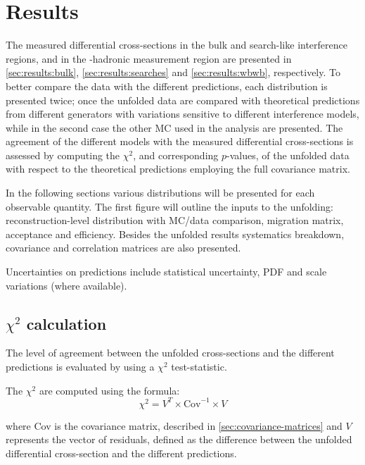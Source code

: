 \section{Results}%
\label{ch:results}

The measured differential cross-sections in the bulk and search-like
interference regions, and in the \Wboson-hadronic measurement region are presented in
\cref{sec:results:bulk}, \cref{sec:results:searches} and \cref{sec:results:wbwb},
respectively.
To better compare the data with the different predictions, each distribution
is presented twice; once the unfolded data are compared with theoretical
predictions from different generators with variations sensitive to different
interference models, while in the second case the other MC used in the analysis
are presented. The agreement of the different models with the measured
differential cross-sections is assessed by computing the \(\chi^2\),
and corresponding \(p\)-values, of the unfolded data with respect
to the theoretical predictions employing the full covariance matrix.

In the following sections various distributions will be presented for each
observable quantity. The first figure will outline the inputs to the unfolding:
reconstruction-level distribution with MC/data comparison, migration matrix,
acceptance and efficiency. Besides the unfolded results systematics breakdown,
covariance and correlation matrices are also presented.

Uncertainties on predictions include statistical uncertainty, PDF and scale variations (where available).


\subsection{\texorpdfstring{\(\chi^2\)}{Chi squared} calculation}

The level of agreement between the unfolded cross-sections and the different
predictions is evaluated by using a \(\chi^2\) test-statistic.

The \(\chi^2\) are computed using the formula:
\begin{equation}\label{eq:chi2}
    \chi^2 = V^T \times \mathrm{Cov}^{-1} \times V
\end{equation}

where Cov is the covariance matrix, described in \cref{sec:covariance-matrices}
and \(V\) represents the vector of residuals, defined as the difference between
the unfolded differential cross-section and the different predictions.

